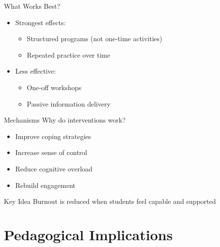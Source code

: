 \documentclass[dvipsnames]{beamer}
\begin{document}
\begin{frame}{What Works Best?}
\begin{itemize}
    \item Strongest effects:
    \begin{itemize}
        \item Structured programs (not one-time activities)
        \item Repeated practice over time
    \end{itemize}
\end{itemize}



\begin{itemize}
    \item Less effective:
    \begin{itemize}
        \item One-off workshops
        \item Passive information delivery
    \end{itemize}
\end{itemize}

\end{frame}

\begin{frame}{Mechanisms}
Why do interventions work?



\begin{itemize}
    \item Improve coping strategies
    \item Increase sense of control
    \item Reduce cognitive overload
    \item Rebuild engagement
\end{itemize}



\begin{block}{Key Idea}
Burnout is reduced when students feel capable and supported
\end{block}

\end{frame}

\section{Pedagogical Implications}
\end{document}
